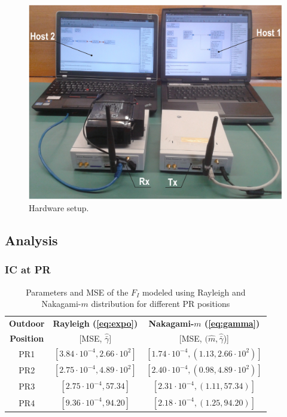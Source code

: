 \begin{figure}[!t]
        \centering
        \includegraphics[width = 0.8\columnwidth]{../kapitel05/figures/setup}
        \caption{Hardware setup.}
        \label{fig:hw_setup}
\end{figure}

\subsection{Analysis}

\subsubsection{\ac{IC} at PR}

\begin{table}
\renewcommand{\arraystretch}{1.3}
\caption{Parameters and MSE of the $F_{I}$ modeled using Rayleigh and Nakagami-$m$ distribution for different PR positions}
\label{tb:MSE_II}
\centering
\begin{tabular}{c||c|c}
\hline
\bfseries Outdoor & \bfseries Rayleigh (\ref{eq:expo}) & \bfseries Nakagami-$m$ (\ref{eq:gamma}) \\
\bfseries Position & [MSE, $\widehat{\bar{\gamma}}]$ & [MSE, $(\widehat{m}, \widehat{\bar{\gamma}}$)] \\
\hline\hline
PR1 & $[3.84 \cdot 10^{-4}, 2.66 \cdot 10^{2} ]$  & $[1.74 \cdot 10^{-4} , (1.13, 2.66 \cdot 10^{2})] $ \\ \hline
PR2 & $[2.75 \cdot 10^{-4}, 4.89 \cdot 10^{2}]$  & $[2.40 \cdot 10^{-4} , (0.98, 4.89 \cdot 10^{2})] $ \\ \hline
PR3 & $[2.75 \cdot 10^{-4}, 57.34]$  & $[2.31 \cdot 10^{-4} , (1.11, 57.34)] $ \\ \hline
PR4 & $[9.36 \cdot 10^{-4}, 94.20]$  & $[2.18 \cdot 10^{-4} , (1.25, 94.20)] $ \\ \hline
\end{tabular}
\end{table}


